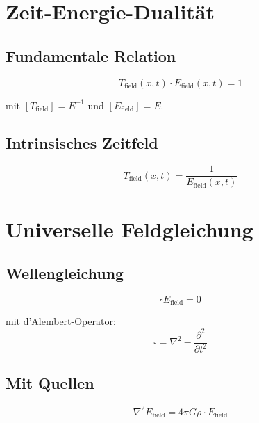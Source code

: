 	\section{Zeit-Energie-Dualität}
	\label{sec:duality}
	
	\subsection{Fundamentale Relation}
	
	\begin{equation}
		T_{\text{field}}(x,t) \cdot E_{\text{field}}(x,t) = 1
		\label{eq:duality}
	\end{equation}
	
	mit $[T_{\text{field}}] = E^{-1}$ und $[E_{\text{field}}] = E$.
	
	\subsection{Intrinsisches Zeitfeld}
	
	\begin{equation}
		T_{\text{field}}(x,t) = \frac{1}{E_{\text{field}}(x,t)}
	\end{equation}
	
	\section{Universelle Feldgleichung}
	\label{sec:field_equation}
	
	\subsection{Wellengleichung}
	
	\begin{equation}
		\square E_{\text{field}} = 0
	\end{equation}
	
	mit d'Alembert-Operator:
	\begin{equation}
		\square = \nabla^2 - \frac{\partial^2}{\partial t^2}
	\end{equation}
	
	\subsection{Mit Quellen}
	
	\begin{equation}
		\nabla^2 E_{\text{field}} = 4\pi G \rho \cdot E_{\text{field}}
	\end{equation}
	
